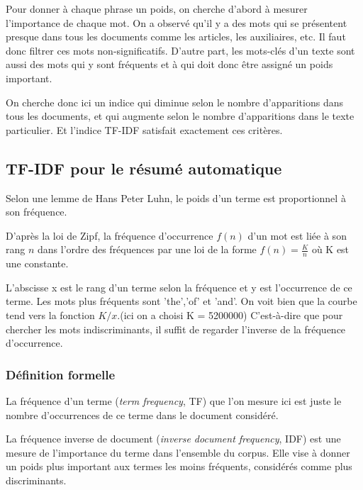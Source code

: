 \documentclass[a4paper, 12pt]{article}
\begin{document}
Pour donner à chaque phrase un poids, on cherche d'abord à mesurer l'importance de chaque mot. On a observé qu'il y a des mots qui se présentent presque dans tous les documents comme les articles, les auxiliaires, etc. Il faut donc filtrer ces mots non-significatifs. D'autre part, les mots-clés d'un texte sont aussi des mots qui y sont fréquents et à qui doit donc être assigné un poids important.

On cherche donc ici un indice qui diminue selon le nombre d'apparitions dans tous les documents, et qui augmente selon le nombre d'apparitions dans le texte particulier. Et l'indice TF-IDF satisfait exactement ces critères.


\subsection{TF-IDF pour le résumé automatique}
Selon une lemme de Hans Peter Luhn, le poids d'un terme est proportionnel à son fréquence.

D'après la loi de Zipf, la fréquence d'occurrence $f(n)$ d'un mot est liée à son rang $n$ dans l'ordre des fréquences par une loi de la forme $f(n) = \frac{K}{n} $ où K est une constante.


L'abscisse x est le rang d'un terme selon la fréquence et y est l'occurrence de ce terme. Les mots plus fréquents sont 'the','of' et 'and'. On voit bien que la courbe tend vers la fonction $K/x$.(ici on a choisi K = 5200000) C'est-à-dire que pour chercher les mots indiscriminants, il suffit de regarder l'inverse de la fréquence d'occurrence.

\subsubsection{Définition formelle}

\begin{definition}[TF]
 La fréquence d'un terme (\textit{term frequency}, TF) que l'on mesure ici est juste le nombre d'occurrences de ce terme dans le document considéré.
\end{definition}

\begin{definition}[IDF]
 La fréquence inverse de document (\textit{inverse document frequency}, IDF) est une mesure de l'importance du terme dans l'ensemble du corpus. Elle vise à donner un poids plus important aux termes les moins fréquents, considérés comme plus discriminants.
\end{definition}
\end{document}
